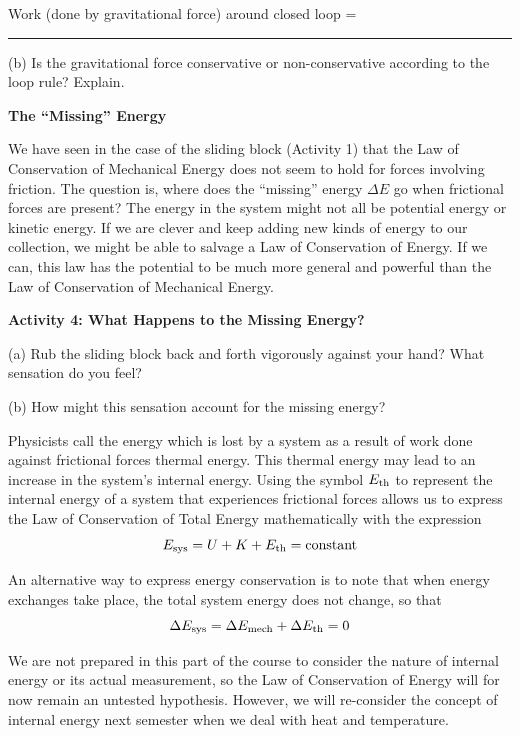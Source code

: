 \hspace{1.5cm}Work (done by gravitational force) around closed loop = \rule{1.5in}{0.1pt}

\answerspace{5mm}

(b) Is the gravitational force conservative or non-conservative according to
the loop rule? Explain.
\answerspace{20mm}

\textbf{The ``Missing'' Energy} 

We have seen in the case of the sliding block (Activity 1) that the Law of Conservation of Mechanical Energy does not seem to hold for forces involving friction. The question is, where does the ``missing'' energy \( \Delta  \)$E$ go when
frictional forces are present? The energy in the system might not all be potential energy or kinetic energy. If we are clever and keep adding new kinds of energy to our collection, we might be able to salvage a Law of Conservation of Energy. If we can, this law has the potential to be much more general and powerful than the Law of Conservation of Mechanical Energy.

\pagebreak[2]
\textbf{Activity 4: What Happens to the Missing Energy?} 

(a) Rub the sliding block back and forth vigorously against your hand? What
sensation do you feel?
\vspace{10mm}

(b) How might this sensation account for the missing energy?
\vspace{20mm}

Physicists call the energy which is lost by a system as a result of work done
against frictional forces thermal energy. This thermal energy may lead to an
increase in the system's internal energy. Using the symbol \(  E_{\rm th} \) to
represent the internal energy of a system that experiences frictional
forces allows us to express the Law of Conservation of Total Energy 
mathematically with the expression
\[E_{\rm sys}=U+K+ E_{\rm th}=\mbox{constant}\]


An alternative way to express energy conservation is to note that when energy
exchanges take place, the total system energy does not change, so that
\[
\Delta E_{\rm sys}=\Delta E_{\rm mech}+\Delta E_{\rm th} = 0\]


We are not prepared in this part of the course to consider the nature of internal energy or its actual measurement, so the Law of Conservation of Energy will
for now remain an untested hypothesis. However, we will re-consider the concept
of internal energy next semester when we deal with heat and temperature.

